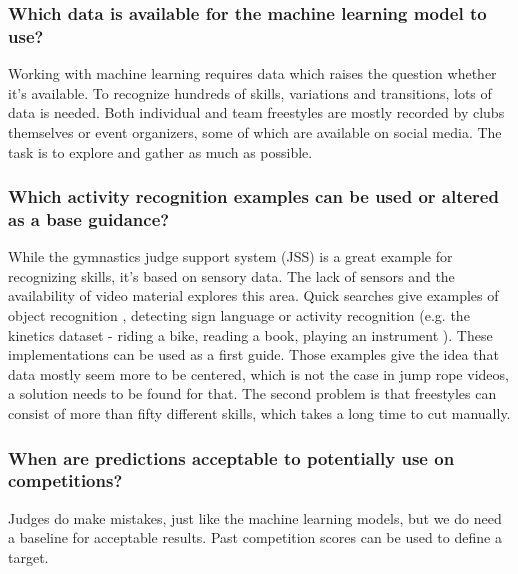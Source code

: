 \subsubsection{Which data is available for the machine learning model to use?}
\label{intro-bp:question-data}

Working with machine learning requires data which raises the question whether it's available. To recognize hundreds of skills, variations and transitions, lots of data is needed. Both individual and team freestyles are mostly recorded by clubs themselves or event organizers, some of which are available on social media. The task is to explore and gather as much as possible.

\subsubsection{Which activity recognition examples can be used or altered as a base guidance?}
\label{intro-bp:question-earlier-research-guidance}

While the gymnastics judge support system (JSS) is a great example for recognizing skills, it's based on sensory data. The lack of sensors and the availability of video material explores this area.
Quick searches give examples of object recognition \autocite{Diwaker_2022}, detecting sign language \autocite{Bora_2023} or activity recognition (e.g. the kinetics dataset - riding a bike, reading a book, playing an instrument \autocite{Kay2017}).
These implementations can be used as a first guide.
Those examples give the idea that data mostly seem more to be centered, which is not the case in jump rope videos, a solution needs to be found for that. The second problem is that freestyles can consist of more than fifty different skills, which takes a long time to cut manually.

\subsubsection{When are predictions acceptable to potentially use on competitions?}
\label{intro-bp:question-acceptable-results}

Judges do make mistakes, just like the machine learning models, but we do need a baseline for acceptable results. Past competition scores can be used to define a target.

\section{}%
\label{sec:onderzoeksdoelstelling}

